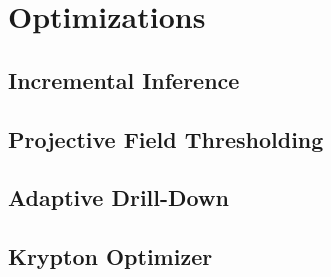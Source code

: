 \section{Optimizations}

\subsection{Incremental Inference}\label{sec:inc_inference}

\subsection{Projective Field Thresholding}

\subsection{Adaptive Drill-Down}

\subsection{Krypton Optimizer}